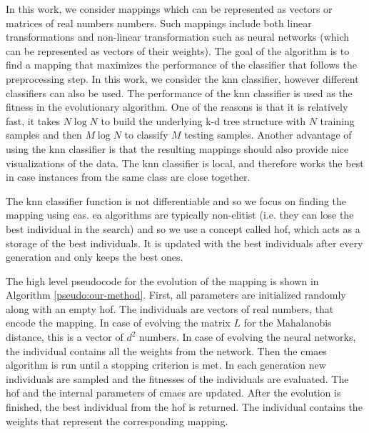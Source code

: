 \documentclass[12pt,a4paper]{report}
\begin{document}
In this work, we consider mappings which can be represented as vectors or matrices of real numbers numbers. Such mappings include both linear transformations and non-linear transformation such as neural networks (which can be represented as vectors of their weights). The goal of the algorithm is to find a mapping that maximizes the performance of the classifier that follows the preprocessing step. In this work, we consider the \ac{knn} classifier, however different classifiers can also be used. The performance of the \ac{knn} classifier is used as the fitness in the evolutionary algorithm. One of the reasons is that it is relatively fast, it takes $N\log{N}$ to build the underlying k-d tree structure with $N$ training samples and then $M \log{N}$ to classify $M$ testing samples. Another advantage of using the \ac{knn} classifier is that the resulting mappings should also provide nice visualizations of the data. The \ac{knn} classifier is local, and therefore works the best in case instances from the same class are close together.

The \ac{knn} classifier function is not differentiable and so we focus on finding the mapping using \aclp{ea}. \Ac{ea} algorithms are typically non-elitist (i.e. they can lose the best individual in the search) and so we use a concept called \acf{hof}, which acts as a storage of the best individuals. It is updated with the best individuals after every generation and only keeps the best ones.

The high level pseudocode for the evolution of the mapping is shown in Algorithm \ref{pseudo:our-method}. First, all parameters are initialized randomly along with an empty \ac{hof}. The individuals are vectors of real numbers, that encode the mapping. In case of evolving the matrix $L$ for the Mahalanobis distance, this is a vector of $d^2$ numbers. In case of evolving the neural networks, the individual contains all the weights from the network. Then the \ac{cmaes} algorithm is run until a stopping criterion is met. In each generation new individuals are sampled and the fitnesses of the individuals are evaluated. The \ac{hof} and the internal parameters of \ac{cmaes} are updated. After the evolution is finished, the best individual from the \ac{hof} is returned. The individual contains the weights that represent the corresponding mapping.
\end{document}
